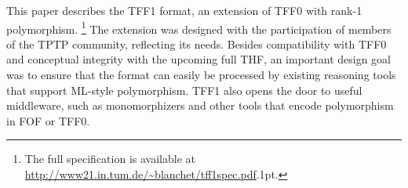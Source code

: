 This paper describes the TFF1
format, an extension of TFF0 with rank-1 polymorphism.%
\footnote{
The full specification is available at
\url{http://www21.in.tum.de/~blanchet/tff1spec.pdf}\kern.1pt.}
The extension was designed with the participation of members of the TPTP
community, reflecting its needs.
Besides compatibility with TFF0 and conceptual integrity with the upcoming full
THF, an important design goal was to ensure that the format can easily be
processed by existing reasoning tools that support ML-style polymorphism. TFF1
also opens the door to useful middleware, such as monomorphizers and other
tools that encode polymorphism in FOF or TFF0.

